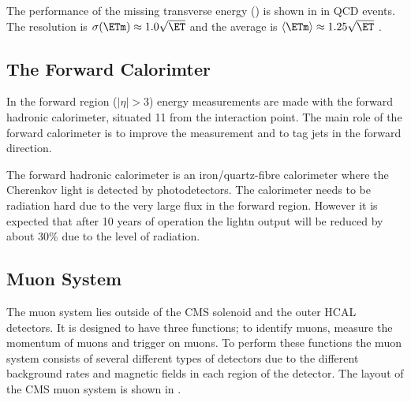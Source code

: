 The performance of the missing transverse energy (\ETm) is shown in
 in QCD events. The \ETm resolution is
$\sigma(\ETm) \approx 1.0 \sqrt \ET$ and the average \ETm is 
$\langle \ETm \rangle \approx 1.25 \sqrt \ET$ \cite{tdr}.

\subsection{The Forward Calorimter}
In the forward region ($|\eta| > 3$) energy measurements are made with the
forward hadronic calorimeter, situated \unit{11}{\meter} from the interaction
point. The main role of the forward calorimeter is to improve the \ETm
measurement and to tag jets in the forward direction.

The forward hadronic calorimeter is an iron/quartz-fibre calorimeter where the
Cherenkov light is detected by photodetectors.  The calorimeter needs to be
radiation hard due to the very large flux in the forward region. However it is
expected that after 10 years of operation the lightn output will be reduced by
about \unit{30}{\%} due to the level of radiation.

\subsection{Muon System}
The muon system lies outside of the CMS solenoid and the outer HCAL detectors.
It is designed to have three functions; to identify muons, measure the momentum
of muons and trigger on muons. To perform these functions the muon system
consists of several different types of detectors due to the different background
rates and magnetic fields in each region of the detector.
The layout of the \acs{CMS} muon system is shown in .

